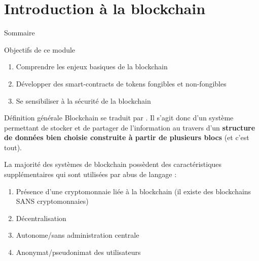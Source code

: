 \section{Introduction à la blockchain}

\begin{frame}{Sommaire}
\end{frame}


\begin{frame}{Objectifs de ce module}
    \begin{enumerate}
        \item Comprendre les enjeux basiques de la blockchain
        \item Développer des smart-contracts de tokens fongibles et non-fongibles
        \item Se sensibiliser à la sécurité de la blockchain
    \end{enumerate}
\end{frame}


\begin{frame}{Définition générale}
    Blockchain se traduit par .
    Il s'agit donc d'un système permettant de stocker et de partager de l'information au travers d'un \textbf{structure de données bien choisie construite à partir de plusieurs blocs} (et c'est tout).

    La majorité des systèmes de blockchain possèdent des caractéristiques supplémentaires qui sont utilisées par abus de langage :

    \begin{enumerate}
        \item Présence d'une cryptomonnaie liée à la blockchain (il existe des blockchains SANS cryptomonnaies)
        \item Décentralisation
        \item Autonome/sans administration centrale
        \item Anonymat/pseudonimat des utilisateurs
    \end{enumerate}
\end{frame}

